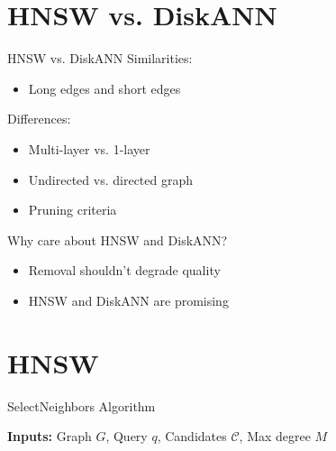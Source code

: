 \section{HNSW vs. DiskANN}

{HNSW vs. DiskANN}
    Similarities:
    \begin{itemize}
        \item Long edges and short edges
    \end{itemize}

    Differences:
    \begin{itemize}
        \item Multi-layer vs. 1-layer
        \item Undirected vs. directed graph
        \item Pruning criteria
    \end{itemize}


{Why care about HNSW and DiskANN?}
    \begin{itemize}
        \item Removal shouldn't degrade quality
        \item HNSW and DiskANN are promising 
    \end{itemize}


\section{HNSW}


\begin{algorithm}[H]
    \caption{SelectNeighbors Algorithm}\label{alg:select-nbrs}
    \begin{algorithmic}[1]
             
                \EndIf
            \EndWhile
        \EndFunction
    \end{algorithmic}
\end{algorithm}

\textbf{Inputs:} Graph \(G\), Query \(q\), Candidates \(\mathcal{C}\), Max degree \(M\)



